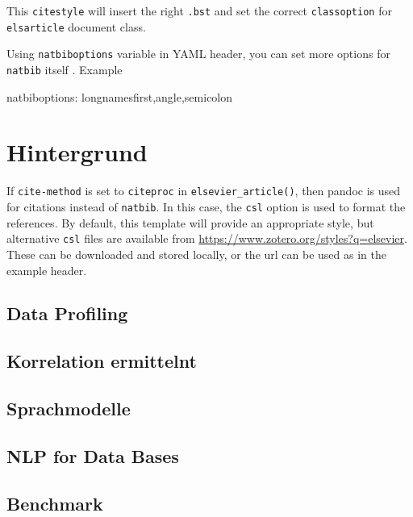 \documentclass[
  11pt,
  authoryear,
  preprint]{elsarticle}
\newenvironment{Shaded}{\begin{snugshade}}{\end{snugshade}}
\newcommand{\AttributeTok}[1]{\textcolor[rgb]{0.40,0.45,0.13}{#1}}
\newcommand{\FunctionTok}[1]{\textcolor[rgb]{0.28,0.35,0.67}{#1}}
\newcommand{\KeywordTok}[1]{\textcolor[rgb]{0.00,0.23,0.31}{#1}}
\begin{document}
This \texttt{citestyle} will insert the right \texttt{.bst} and set the
correct \texttt{classoption} for \texttt{elsarticle} document class.

Using \texttt{natbiboptions} variable in YAML header, you can set more
options for \texttt{natbib} itself . Example

\begin{Shaded}
\begin{Highlighting}[]
\FunctionTok{natbiboptions}\KeywordTok{:}\AttributeTok{ longnamesfirst,angle,semicolon}
\end{Highlighting}
\end{Shaded}

\section{Hintergrund}\label{hintergrund}

If \texttt{cite-method} is set to \texttt{citeproc} in
\texttt{elsevier\_article()}, then pandoc is used for citations instead
of \texttt{natbib}. In this case, the \texttt{csl} option is used to
format the references. By default, this template will provide an
appropriate style, but alternative \texttt{csl} files are available from
\url{https://www.zotero.org/styles?q=elsevier}. These can be downloaded
and stored locally, or the url can be used as in the example header.

\subsection{Data Profiling}\label{data-profiling}

\subsection{Korrelation ermittelnt}\label{korrelation-ermittelnt}

\subsection{Sprachmodelle}\label{sprachmodelle}

\subsection{NLP for Data Bases}\label{nlp-for-data-bases}

\subsection{Benchmark}\label{benchmark}
\end{document}
